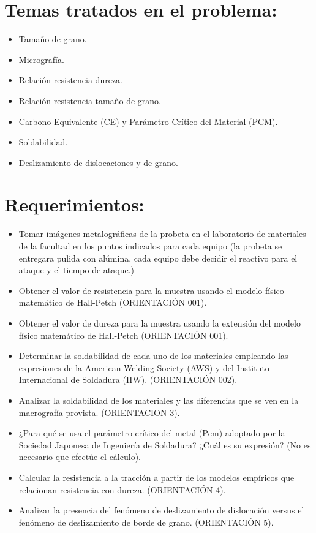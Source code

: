 \documentclass[12pt,a4paper]{article}
\begin{document}

\newpage
\tableofcontents

\section{Temas tratados en el problema:}
\begin{itemize}
    \item Tamaño de grano.
    \item Micrografía.
    \item Relación resistencia-dureza.
    \item Relación resistencia-tamaño de grano.
    \item Carbono Equivalente (CE) y Parámetro Crítico del Material (PCM).
    \item Soldabilidad.
    \item Deslizamiento de dislocaciones y de grano.
\end{itemize}

\section{Requerimientos:}
\begin{itemize}
    \item Tomar imágenes metalográficas de la probeta en el laboratorio de materiales de la facultad en los puntos indicados para  cada equipo (la probeta se  entregara pulida con alúmina, cada equipo debe decidir el reactivo para el ataque y el tiempo de ataque.)
    \item Obtener el valor de resistencia para la muestra usando el modelo físico matemático de Hall-Petch (ORIENTACIÓN 001).
    \item Obtener el valor de dureza para la muestra usando la extensión del modelo físico matemático de Hall-Petch  (ORIENTACIÓN 001).
    \item Determinar la soldabilidad de cada uno de los materiales empleando las expresiones de la American Welding Society (AWS) y del Instituto Internacional de Soldadura (IIW). (ORIENTACIÓN 002).
    \item Analizar la soldabilidad de los materiales y las diferencias que se ven en la macrografía provista. (ORIENTACION 3).
    \item ¿Para qué se usa el parámetro crítico del metal (Pcm) adoptado por la Sociedad Japonesa de Ingeniería de Soldadura? ¿Cuál es su expresión? (No es necesario que efectúe el cálculo).
    \item Calcular la resistencia a la tracción a partir de los modelos empíricos que relacionan resistencia con dureza.  (ORIENTACIÓN 4).
    \item Analizar la presencia del fenómeno de deslizamiento de dislocación versus el fenómeno de deslizamiento de borde de grano. (ORIENTACIÓN 5).
\end{itemize}
\end{document}
